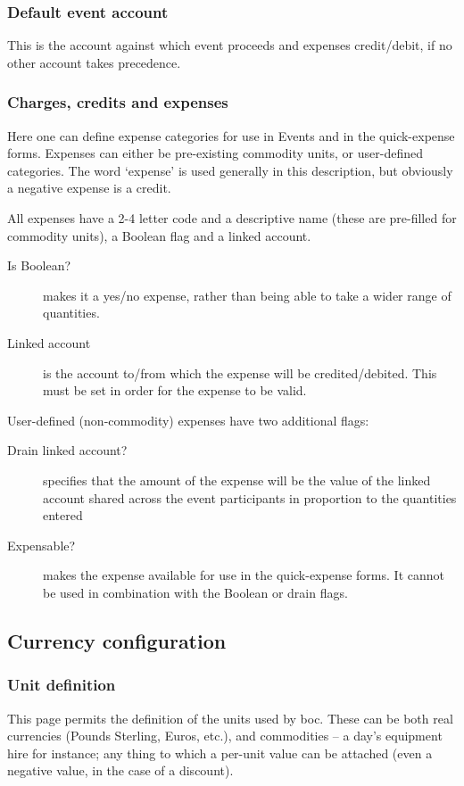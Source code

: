 \documentclass{report}
\begin{document}
\subsubsection{Default event account}

This is the account against which event proceeds and expenses credit/debit, if no other account takes precedence.

\subsubsection{Charges, credits and expenses}\label{fee_conf}

Here one can define expense categories for use in Events and in the quick-expense forms.  Expenses can either be pre-existing commodity units, or user-defined categories.  The word `expense' is used generally in this description, but obviously a negative expense is a credit.

All expenses have a 2-4 letter code and a descriptive name (these are pre-filled for commodity units), a Boolean flag and a linked account.

\begin{description}
\item[Is Boolean?] makes it a yes/no expense, rather than being able to take a wider range of quantities.
\item[Linked account] is the account to/from which the expense will be credited/debited.  This must be set in order for the expense to be valid.
\end{description}

User-defined (non-commodity) expenses have two additional flags:

\begin{description}
\item[Drain linked account?] specifies that the amount of the expense will be the value of the linked account shared across the event participants in proportion to the quantities entered
\item[Expensable?] makes the expense available for use in the quick-expense forms.  It cannot be used in combination with the Boolean or drain flags.
\end{description}

\subsection{Currency configuration}\label{edit_units}

\subsubsection{Unit definition}
This page permits the definition of the units used by boc.  These can be both real currencies (Pounds Sterling, Euros, etc.), and commodities -- a day's equipment hire for instance; any thing to which a per-unit value can be attached (even a negative value, in the case of a discount).
\end{document}
